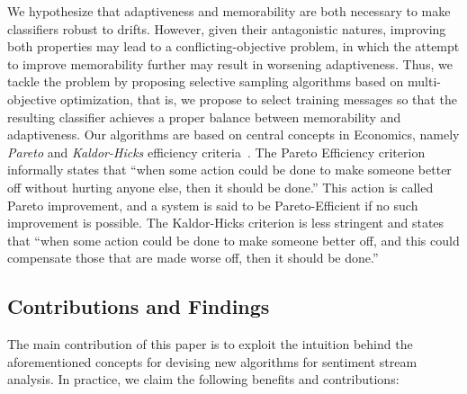 We hypothesize that adaptiveness and memorability are both necessary to make classifiers robust to drifts. 
However, given their antagonistic natures, improving both properties may lead to a conflicting-objective problem, in which the attempt to improve memorability further may result in worsening adaptiveness.
Thus, we tackle the problem
by proposing selective sampling algorithms based on multi-objective optimization, that is, we propose to select training messages so that the resulting classifier achieves a proper balance between memorability and adaptiveness.
Our algorithms are based on
central concepts in Economics, namely {\em Pareto} and {\em Kaldor-Hicks} efficiency criteria~\cite{palda@book,kaldor,hicks}. The Pareto Efficiency criterion informally states
that ``when some action could be done to make someone better off without
hurting anyone else, then it should be done.'' This action is called Pareto improvement,
and a system is said to be Pareto-Efficient if no such improvement is possible.
The Kaldor-Hicks criterion is less stringent and states that ``when some action could be done to make someone better off, and this could compensate those that are made worse off, then it should be done.''

\subsection*{Contributions and Findings}
The main contribution of this paper is to exploit the intuition behind the aforementioned concepts for devising new algorithms for sentiment stream analysis.
In practice, we claim the following benefits and contributions:


